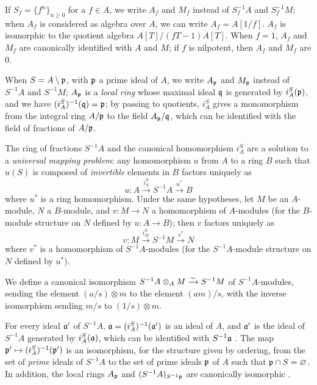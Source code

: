 \begin{env}[1.2.3]
\label{0.1.2.3}
If $S_f=\{f^n\}_{n\geqslant 0}$ for a $f\in A$, we write $A_f$ and $M_f$ instead
of $S_f^{-1}A$ and $S_f^{-1}M$; when $A_f$ is considered as algebra over $A$, we
can write $A_f=A[1/f]$. $A_f$ is isomorphic to the quotient algebra
$A[T]/(fT-1)A[T]$. When $f=1$, $A_f$ and $M_f$ are canonically identified with $A$ and
$M$; if $f$ is nilpotent, then $A_f$ and $M_f$ are $0$.

When $S=A\setminus\mathfrak{p}$, with $\mathfrak{p}$ a prime ideal of $A$, we write
$A_\mathfrak{p}$ and $M_\mathfrak{p}$ instead of $S^{-1}A$ and $S^{-1}M$;
$A_\mathfrak{p}$ is a {\em local ring} whose maximal ideal $\mathfrak{q}$ is
generated by $i_A^S(\mathfrak{p})$, and we have
$(i_A^S)^{-1}(\mathfrak{q})=\mathfrak{p}$; by passing to quotients, $i_A^S$
gives a monomorphism from the integral ring $A/\mathfrak{p}$ to the field
$A_\mathfrak{p}/\mathfrak{q}$, which can be identified with the field of fractions of
$A/\mathfrak{p}$.
\end{env}

\begin{env}[1.2.4]
\label{0.1.2.4}
The ring of fractions $S^{-1}A$ and the canonical homomorphism $i_A^S$ are a
solution to a {\em universal mapping problem}: any homomorphism $u$ from $A$ to
a ring $B$ such that $u(S)$ is composed of {\em invertible} elements in $B$
factors uniquely as
\[
  u:A\xrightarrow{i_A^S}S^{-1}A\xrightarrow{u^*}B
\]
where $u^*$ is a ring homomorphism. Under the same hypotheses, let $M$ be an
$A$-module, $N$ a $B$-module, and $v:M\to N$ a homomorphism of $A$-modules (for
the $B$-module structure on $N$ defined by $u:A\to B$); then $v$ factors
uniquely as
\[
  v:M\xrightarrow{i_M^S}S^{-1}M\xrightarrow{v^*}N
\]
where $v^*$ is a homomorphism of $S^{-1}A$-modules (for the $S^{-1}A$-module
structure on $N$ defined by $u^*$).
\end{env}

\begin{env}[1.2.5]
\label{0.1.2.5}
We define a canonical isomorphism $S^{-1}A\otimes_A M\xrightarrow{\sim} S^{-1}M$ of
$S^{-1}A$-modules, sending the element $(a/s)\otimes m$ to the element $(am)/s$,
with the inverse isomorphism sending $m/s$ to $(1/s)\otimes m$.
\end{env}

\begin{env}[1.2.6]
\label{0.1.2.6}
For every ideal $\mathfrak{a}'$ of $S^{-1}A$,
$\mathfrak{a}=(i_A^S)^{-1}(\mathfrak{a}')$ is an ideal of $A$, and
$\mathfrak{a}'$ is the ideal of $S^{-1}A$ generated by $i_A^S(\mathfrak{a})$,
which can be identified with $S^{-1}\mathfrak{a}$ . The map
$\mathfrak{p}'\mapsto(i_A^S)^{-1}(\mathfrak{p}')$ is an isomorphism, for the structure given by ordering, from the set of {\em prime} ideals of $S^{-1}A$ to the set of
prime ideals $\mathfrak{p}$ of $A$ such that $\mathfrak{p}\cap S=\varnothing$. In
addition, the local rings $A_\mathfrak{p}$ and $(S^{-1}A)_{S^{-1}\mathfrak{p}}$
are canonically isomorphic .
\end{env}


